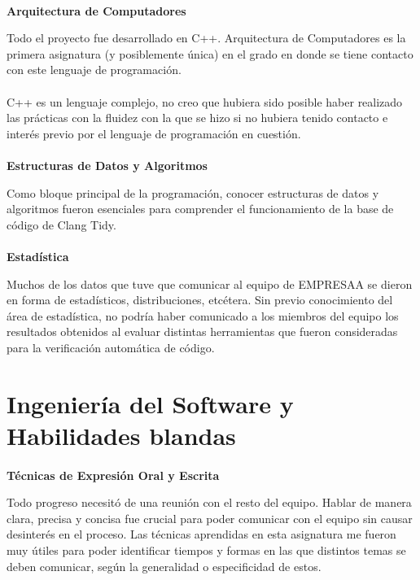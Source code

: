 \documentclass[12pt]{extreport} %
\begin{document}
\paragraph{}
\textbf{Arquitectura de Computadores}

Todo el proyecto fue desarrollado en C++. Arquitectura de Computadores
es la primera asignatura (y posiblemente única) en el grado en donde
se tiene contacto con este lenguaje de programación.

\paragraph{}
C++ es un lenguaje complejo, no creo que hubiera sido posible haber
realizado las prácticas con la fluidez con la que se hizo si no
hubiera tenido contacto e interés previo por el lenguaje de
programación en cuestión.

\paragraph{}
\textbf{Estructuras de Datos y Algoritmos}

Como bloque principal de la programación, conocer estructuras de datos
y algoritmos fueron esenciales para comprender el funcionamiento de la
base de código de Clang Tidy.

\paragraph{}
\textbf{Estadística}

Muchos de los datos que tuve que comunicar al equipo de EMPRESAA se
dieron en forma de estadísticos, distribuciones, etcétera. Sin previo
conocimiento del área de estadística, no podría haber comunicado a los
miembros del equipo los resultados obtenidos al evaluar distintas
herramientas que fueron consideradas para la verificación automática
de código.

\section{Ingeniería del Software y Habilidades blandas}

\paragraph{}
\textbf{Técnicas de Expresión Oral y Escrita}

Todo progreso necesitó de una reunión con el resto del equipo. Hablar
de manera clara, precisa y concisa fue crucial para poder comunicar
con el equipo sin causar desinterés en el proceso. Las técnicas
aprendidas en esta asignatura me fueron muy útiles para poder
identificar tiempos y formas en las que distintos temas se deben
comunicar, según la generalidad o especificidad de estos.
\end{document}
